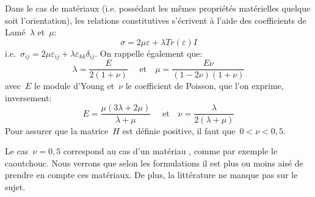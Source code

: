 \medskip
Dans le cas de matériaux  (i.e. possédant les mêmes
propriétés matérielles quelque soit l'orientation), les relations constitutives s'écrivent
à l'aide des coefficients de Lamé~$\lambda$ et~$\mu$:
\begin{equation}\sigma = 2\mu\varepsilon+\lambda Tr(\varepsilon)I\end{equation}
i.e.~$\sigma_{ij}=2\mu\varepsilon_{ij}+\lambda\varepsilon_{kk}\delta_{ij}$.
On rappelle également que:
\begin{equation}\lambda=\dfrac{E}{2(1+\nu)} \quad \text{ et} \quad \mu=\dfrac{E\nu}{(1-2\nu)(1+\nu)}
\end{equation}
avec~$E$ le module d'Young et~$\nu$ le coefficient de Poisson, que l'on exprime, inversement:
\begin{equation}
E=\dfrac{\mu(3\lambda+2\mu)}{\lambda+\mu} \quad\text{ et}\quad
\nu=\dfrac{\lambda}{2(\lambda+\mu)}
\end{equation}
Pour assurer que la matrice~$H$ est définie positive, il faut que~$0<\nu<0,5$.

\medskip
Le cas~$\nu=0,5$ correspond au cas d'un matériau , comme par
exemple le caoutchouc.
Nous verrons que selon les formulations il est plus ou moins aisé de prendre en compte
ces matériaux. De plus, la littérature ne manque pas sur le sujet.

